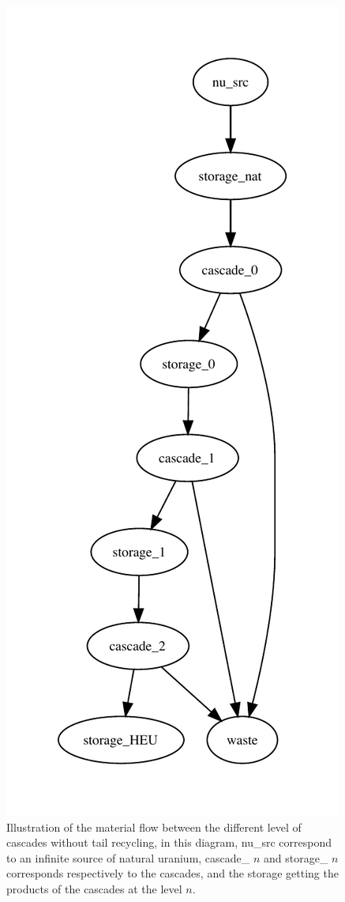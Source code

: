 \documentclass{anstrans}
\begin{document}
\begin{figure}[ht]
  \includegraphics[scale=0.7]{flow_case_2_no_recy.pdf}
  \caption{Illustration of the material flow between the different level of
      cascades without tail recycling, in this diagram, nu\_src correspond to an
      infinite source of natural uranium, cascade\_ $n$ and storage\_ $n$
      corresponds respectively to the cascades, and the storage getting the
  products of the cascades at the level $n$.}\label{fig:flow}
\end{figure}
\end{document}

